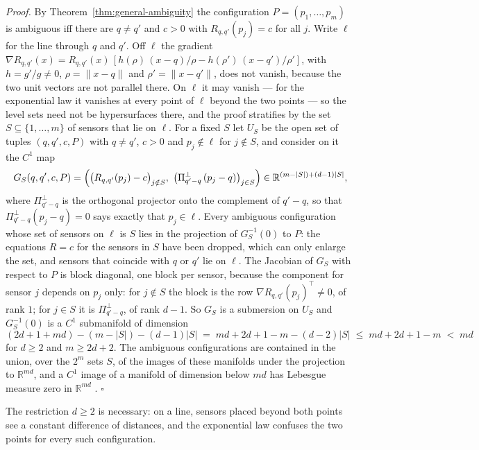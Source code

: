 \documentclass{article}
\begin{document}
\textit{Proof.} By Theorem~\ref{thm:general-ambiguity} the configuration $P = (p_1, \dots, p_m)$ is ambiguous iff there are $q \ne q'$ and $c > 0$ with $R_{q,q'}(p_j) = c$ for all $j$. Write $\ell$ for the line through $q$ and $q'$. Off $\ell$ the gradient $\nabla R_{q,q'}(x) = R_{q,q'}(x)\,[h(\rho)\,(x - q)/\rho - h(\rho')\,(x - q')/\rho']$, with $h = g'/g \neq 0$, $\rho = \lVert x - q \rVert$ and $\rho' = \lVert x - q' \rVert$, does not vanish, because the two unit vectors are not parallel there. On $\ell$ it may vanish --- for the exponential law it vanishes at every point of $\ell$ beyond the two points --- so the level sets need not be hypersurfaces there, and the proof stratifies by the set $S \subseteq \{1, \dots, m\}$ of sensors that lie on $\ell$. For a fixed $S$ let $U_S$ be the open set of tuples $(q, q', c, P)$ with $q \ne q'$, $c > 0$ and $p_j \notin \ell$ for $j \notin S$, and consider on it the $C^{1}$ map
\[
G_S(q, q', c, P) = \Bigl( \bigl(R_{q,q'}(p_j) - c\bigr)_{j \notin S},\ \bigl(\Pi^{\perp}_{q' - q}\,(p_j - q)\bigr)_{j \in S} \Bigr) \in \mathbb{R}^{(m - |S|) + (d - 1)|S|} ,
\]
where $\Pi^{\perp}_{q' - q}$ is the orthogonal projector onto the complement of $q' - q$, so that $\Pi^{\perp}_{q' - q}(p_j - q) = 0$ says exactly that $p_j \in \ell$. Every ambiguous configuration whose set of sensors on $\ell$ is $S$ lies in the projection of $G_S^{-1}(0)$ to $P$: the equations $R = c$ for the sensors in $S$ have been dropped, which can only enlarge the set, and sensors that coincide with $q$ or $q'$ lie on $\ell$. The Jacobian of $G_S$ with respect to $P$ is block diagonal, one block per sensor, because the component for sensor $j$ depends on $p_j$ only: for $j \notin S$ the block is the row $\nabla R_{q,q'}(p_j)^{\top} \ne 0$, of rank $1$; for $j \in S$ it is $\Pi^{\perp}_{q' - q}$, of rank $d - 1$. So $G_S$ is a submersion on $U_S$ and $G_S^{-1}(0)$ is a $C^{1}$ submanifold of dimension
\[
(2d + 1 + md) - (m - |S|) - (d - 1)|S| \;=\; md + 2d + 1 - m - (d - 2)|S| \;\le\; md + 2d + 1 - m \;<\; md
\]
for $d \ge 2$ and $m \ge 2d + 2$. The ambiguous configurations are contained in the union, over the $2^{m}$ sets $S$, of the images of these manifolds under the projection to $\mathbb{R}^{md}$, and a $C^{1}$ image of a manifold of dimension below $md$ has Lebesgue measure zero in $\mathbb{R}^{md}$ \cite{ref-Sard}. $\square$

The restriction $d \ge 2$ is necessary: on a line, sensors placed beyond both points see a constant difference of distances, and the exponential law confuses the two points for every such configuration.
\end{document}
